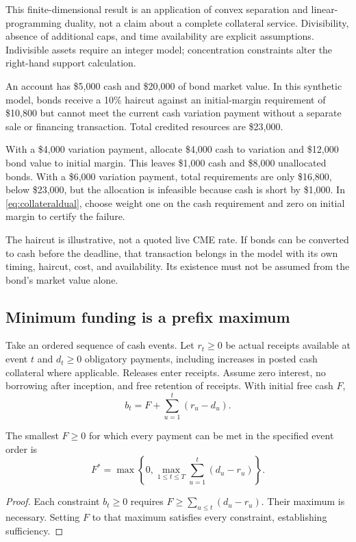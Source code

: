 This finite-dimensional result is an application of convex separation and linear-programming duality, not a claim about a complete collateral service. Divisibility, absence of additional caps, and time availability are explicit assumptions. Indivisible assets require an integer model; concentration constraints alter the right-hand support calculation.

\begin{example}\label{ex:collateral}
An account has \$5,000 cash and \$20,000 of bond market value. In this synthetic model, bonds receive a 10\% haircut against an initial-margin requirement of \$10,800 but cannot meet the current cash variation payment without a separate sale or financing transaction. Total credited resources are \$23,000.

With a \$4,000 variation payment, allocate \$4,000 cash to variation and \$12,000 bond value to initial margin. This leaves \$1,000 cash and \$8,000 unallocated bonds. With a \$6,000 variation payment, total requirements are only \$16,800, below \$23,000, but the allocation is infeasible because cash is short by \$1,000. In \eqref{eq:collateraldual}, choose weight one on the cash requirement and zero on initial margin to certify the failure.
\end{example}

The haircut is illustrative, not a quoted live CME rate. If bonds can be converted to cash before the deadline, that transaction belongs in the model with its own timing, haircut, cost, and availability. Its existence must not be assumed from the bond's market value alone.

\subsection{Minimum funding is a prefix maximum}

Take an ordered sequence of cash events. Let $r_t\ge0$ be actual receipts available at event $t$ and $d_t\ge0$ obligatory payments, including increases in posted cash collateral where applicable. Releases enter receipts. Assume zero interest, no borrowing after inception, and free retention of receipts. With initial free cash $F$,
\begin{equation}
 b_t=F+\sum_{u=1}^t(r_u-d_u).
\end{equation}

\begin{theorem}\label{thm:funding}
The smallest $F\ge0$ for which every payment can be met in the specified event order is
\begin{equation}
 F^*=\max\left\{0,\max_{1\le t\le T}\sum_{u=1}^t(d_u-r_u)\right\}.
\label{eq:funding}
\end{equation}
\end{theorem}
\begin{proof}
Each constraint $b_t\ge0$ requires $F\ge\sum_{u\le t}(d_u-r_u)$. Their maximum is necessary. Setting $F$ to that maximum satisfies every constraint, establishing sufficiency.
\end{proof}

